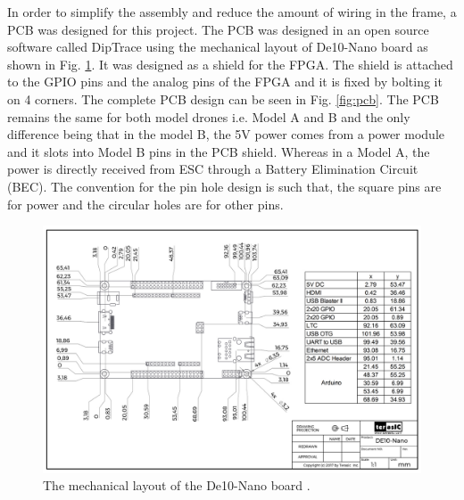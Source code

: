 In order to simplify the assembly and reduce the amount of wiring in the frame, a PCB was designed for this project.
The PCB was designed in an open source software called DipTrace using the mechanical layout of De10-Nano board as shown in Fig. \ref{fig:mech_layout}. It was designed as a shield for the FPGA. The shield is attached to the GPIO pins and the analog pins of the FPGA and it is fixed by bolting it on 4 corners. The complete PCB design can be seen in Fig. \ref{fig:pcb}.  The PCB remains the same for both model drones i.e. Model A and B and the only difference being that in the model B, the 5V power comes from a power module and it slots into Model B pins in the PCB shield. Whereas in a Model A, the power is directly received from ESC through a Battery Elimination Circuit (BEC). The convention for the pin hole design is such that, the square pins are for power and the circular holes are for other pins.

\begin{figure}[!htb]
    \centering
    \includegraphics[width=\textwidth]{Figures/hardware/mechanical_layout.jpg}
    \caption{The mechanical layout of the De10-Nano board \cite{bib:fpga_layout}.}
    \label{fig:mech_layout}
\end{figure}

